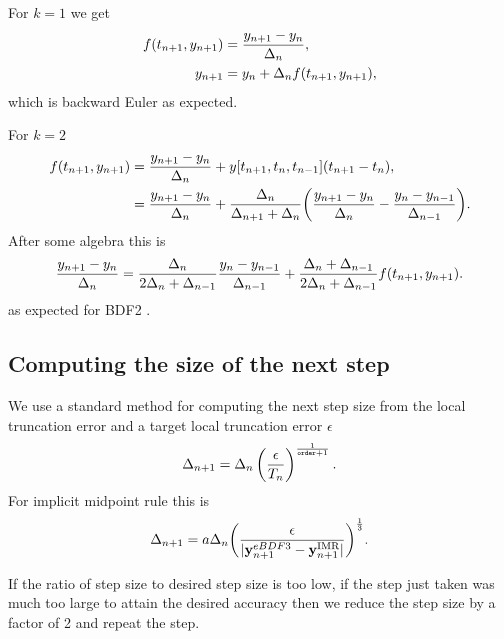 For $k=1$ we get
\begin{equation}
  \begin{aligned}
    f(t_{n+1}, y_{n+1}) &= \frac{y_{n+1} - y_n}{\Delta_{n}}, \\
    y_{n+1} &= y_n + \Delta_{n} f(t_{n+1}, y_{n+1}),
  \end{aligned}
\end{equation}
which is backward Euler as expected.

For $k=2$
\begin{equation}
  \label{eqn:bdf2-derivation}
  \begin{aligned}
    f(t_{n+1}, y_{n+1}) &= \frac{y_{n+1} - y_n}{\Delta_{n}} +  y[t_{n+1}, t_{n}, t_{n-1}](t_{n+1} - t_n), \\
    &= \frac{y_{n+1} - y_n}{\Delta_{n}} +  \frac{\Delta_{n}}{\Delta_{n+1} + \Delta_{n}} {\left( \frac{y_{n+1} - y_n}{\Delta_{n}} - \frac{y_n - y_{n-1}}{\Delta_{n-1}} \right)}. \\
  \end{aligned}
\end{equation}
After some algebra this is
\begin{equation}
  \label{eqn:bdf2-derivation-rearranged}
  \begin{aligned}
    \frac{y_{n+1} - y_n}{\Delta_{n}} = \frac{\Delta_{n}}{2\Delta_{n} + \Delta_{n-1}} \frac{y_n - y_{n-1}}{\Delta_{n-1}} 
    + \frac{\Delta_{n} + \Delta_{n-1}}{2\Delta_{n} + \Delta_{n-1}} f(t_{n+1}, y_{n+1}).
  \end{aligned}
\end{equation}
as expected for BDF2 \cite[pg. 715]{GreshoSani}.


\subsection{Computing the size of the next step}

\renewcommand{\toltt}{\epsilon}

We use a standard method \cite[pg.268]{Gresho-Sani} for computing the next step size from the local truncation error and a target local truncation error $\toltt$
\begin{equation}
\dtx{n+1} = \dtn \left( \frac{\toltt}{\lte}  \right) ^{\frac{1}{\texttt{order}+1}}.
\end{equation}
For implicit midpoint rule this is
\begin{equation}
  \dtx{n+1} = a \dtn \bigb{ \frac{\toltt}{\abs{\yv_{n+1}^{eBDF3} - \yv_{n+1}^\IMP}} }^{\frac{1}{3}}.
\end{equation}

If the ratio of step size to desired step size is too low, \ie if the step just taken was much too large to attain the desired accuracy then we reduce the step size by a factor of 2 and repeat the step.

